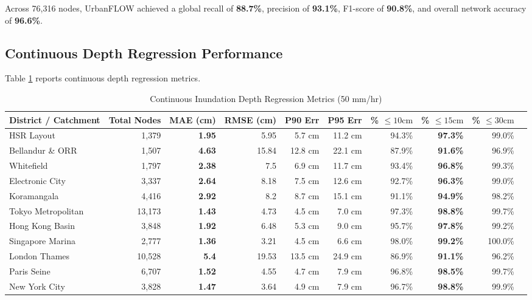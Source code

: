 \documentclass[conference]{IEEEtran}
\begin{document}
Across 76,316 nodes, UrbanFLOW achieved a global recall of \textbf{88.7\%}, precision of \textbf{93.1\%}, F1-score of \textbf{90.8\%}, and overall network accuracy of \textbf{96.6\%}.

\subsection{Continuous Depth Regression Performance}
Table \ref{tab:continuous_regression} reports continuous depth regression metrics.

\begin{table}[t]
\caption{Continuous Inundation Depth Regression Metrics (50 mm/hr)}
\label{tab:continuous_regression}
\centering
\small
\begin{tabular}{lrrrrrrrrr}
\toprule
\textbf{District / Catchment} & \textbf{Total Nodes} & \textbf{MAE (cm)} & \textbf{RMSE (cm)} & \textbf{P90 Err} & \textbf{P95 Err} & \textbf{\% $\le 10\text{cm}$} & \textbf{\% $\le 15\text{cm}$} & \textbf{\% $\le 30\text{cm}$} \\
\midrule
HSR Layout & 1,379 & \textbf{1.95} & 5.95 & 5.7 cm & 11.2 cm & 94.3\% & \textbf{97.3\%} & 99.0\% \\
Bellandur \& ORR & 1,507 & \textbf{4.63} & 15.84 & 12.8 cm & 22.1 cm & 87.9\% & \textbf{91.6\%} & 96.9\% \\
Whitefield & 1,797 & \textbf{2.38} & 7.5 & 6.9 cm & 11.7 cm & 93.4\% & \textbf{96.8\%} & 99.3\% \\
Electronic City & 3,337 & \textbf{2.64} & 8.18 & 7.5 cm & 12.6 cm & 92.7\% & \textbf{96.3\%} & 99.0\% \\
Koramangala & 4,416 & \textbf{2.92} & 8.2 & 8.7 cm & 15.1 cm & 91.1\% & \textbf{94.9\%} & 98.2\% \\
Tokyo Metropolitan & 13,173 & \textbf{1.43} & 4.73 & 4.5 cm & 7.0 cm & 97.3\% & \textbf{98.8\%} & 99.7\% \\
Hong Kong Basin & 3,848 & \textbf{1.92} & 6.48 & 5.3 cm & 9.0 cm & 95.7\% & \textbf{97.8\%} & 99.2\% \\
Singapore Marina & 2,777 & \textbf{1.36} & 3.21 & 4.5 cm & 6.6 cm & 98.0\% & \textbf{99.2\%} & 100.0\% \\
London Thames & 10,528 & \textbf{5.4} & 19.53 & 13.5 cm & 24.9 cm & 86.9\% & \textbf{91.1\%} & 96.2\% \\
Paris Seine & 6,707 & \textbf{1.52} & 4.55 & 4.7 cm & 7.9 cm & 96.8\% & \textbf{98.5\%} & 99.7\% \\
New York City & 3,828 & \textbf{1.47} & 3.64 & 4.9 cm & 7.9 cm & 96.7\% & \textbf{98.8\%} & 99.9\% \\

\end{tabular}
\end{table}
\end{document}
